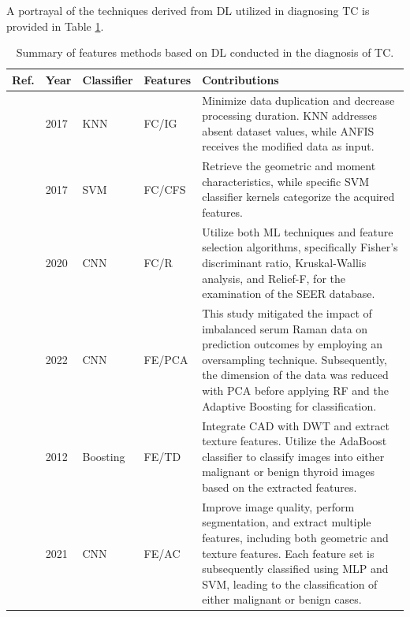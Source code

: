 \documentclass[a4paper,fleqn]{cas-sc}
\begin{document}
\noindent A portrayal of the techniques derived from \ac{DL} utilized in diagnosing \ac{TC} is provided in Table \ref{table:6}.


\begin{table}[t!]
\caption{Summary of features methods based on \ac{DL} conducted in the diagnosis of TC.}
\label{table:6}
\scriptsize

\renewcommand{\arraystretch}{1.5} %
\begin{tabular}{
m{5mm}
m{10mm}
m{10mm}
m{14mm}
m{100mm}
}
\hline




{\small Ref.} & {\small Year} & {\small Classifier} & {\small Features} & {\small Contributions}\\ \hline

{\small \cite{ahmad2017thyroid}} & 2017 & KNN & FC/IG &  Minimize data duplication and decrease processing duration. KNN addresses absent dataset values, while ANFIS receives the modified data as input. \\

{\small \cite{nugroho2017classification}} & 2017 & \ac{SVM} & FC/CFS &  Retrieve the geometric and moment characteristics, while specific \ac{SVM} classifier kernels categorize the acquired features.\\



{\small \cite{mourad2020machine}} & 2020 & CNN & FC/R &  Utilize both \ac{ML} techniques and feature selection algorithms, specifically Fisher's discriminant ratio, Kruskal-Wallis analysis, and Relief-F, for the examination of the SEER database. \\

{\small \cite{song2022rapid}} & 2022 & CNN & FE/\ac{PCA} & This study mitigated the impact of imbalanced serum Raman data on prediction outcomes by employing an oversampling technique. Subsequently, the dimension of the data was reduced with \ac{PCA} before applying \ac{RF} and the Adaptive Boosting for classification.\\


{\small \cite{acharya2012thyroscreen}} & 2012 & Boosting & FE/\ac{TD} & Integrate \ac{CAD} with \ac{DWT} and extract texture features. Utilize the AdaBoost classifier to classify images into either malignant or benign thyroid images based on the extracted features.\\

{\small \cite{nugroho2021computer}} & 2021 & CNN & FE/AC & Improve image quality, perform segmentation, and extract multiple features, including both geometric and texture features. Each feature set is subsequently classified using MLP and \ac{SVM}, leading to the classification of either malignant or benign cases. \\


\end{tabular}
\end{table}
\end{document}
